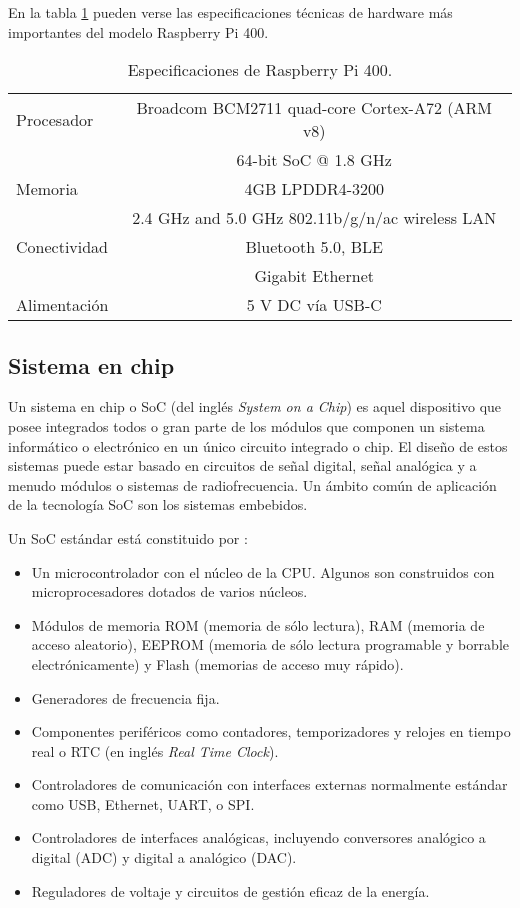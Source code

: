 En la tabla \ref{tab:Especificaciones Raspberry Pi 400} pueden verse las especificaciones técnicas de hardware más importantes del modelo Raspberry Pi 400.

\begin{table}[h]
\centering
\caption[Raspberry Pi 400]{Especificaciones de Raspberry Pi 400.}
\begin{tabular}{l c}
\toprule
Procesador		&	Broadcom BCM2711 quad-core Cortex-A72 (ARM v8) \\
				&	64-bit SoC @ 1.8 GHz \\
\midrule
Memoria			&	4GB LPDDR4-3200 \\
\midrule
				&	2.4 GHz and 5.0 GHz 802.11b/g/n/ac wireless LAN \\
Conectividad		&	Bluetooth 5.0, BLE\\
				&   Gigabit Ethernet \\
\midrule
Alimentación		&	5 V DC vía USB-C\\
\bottomrule
\hline
\end{tabular}
\label{tab:Especificaciones Raspberry Pi 400}
\end{table}

\subsection{Sistema en chip}
\label{subsection:SistemaEnChip}

Un sistema en chip o SoC (del inglés \textit{System on a Chip}) es aquel dispositivo que posee integrados todos o gran parte de los módulos que componen un sistema informático o electrónico en un único circuito integrado o chip. El diseño de estos sistemas puede estar basado en circuitos de señal digital, señal analógica y a menudo módulos o sistemas de radiofrecuencia. Un ámbito común de aplicación de la tecnología SoC son los sistemas embebidos.

Un SoC estándar está constituido por \citep{12}:

\begin{itemize}
	\item Un microcontrolador con el núcleo de la CPU. Algunos son construidos con microprocesadores dotados de varios núcleos.
	\item Módulos de memoria ROM (memoria de sólo lectura), RAM (memoria de acceso aleatorio), EEPROM (memoria de sólo lectura programable y borrable electrónicamente) y Flash (memorias de acceso muy rápido).
	\item Generadores de frecuencia fija.
	\item Componentes periféricos como contadores, temporizadores y relojes en tiempo real o RTC (en inglés \textit{Real Time Clock}).
	\item Controladores de comunicación con interfaces externas normalmente estándar como USB, Ethernet, UART, o SPI.
	\item Controladores de interfaces analógicas, incluyendo conversores analógico a digital (ADC) y digital a analógico (DAC).
	\item Reguladores de voltaje y circuitos de gestión eficaz de la energía.
\end{itemize}

